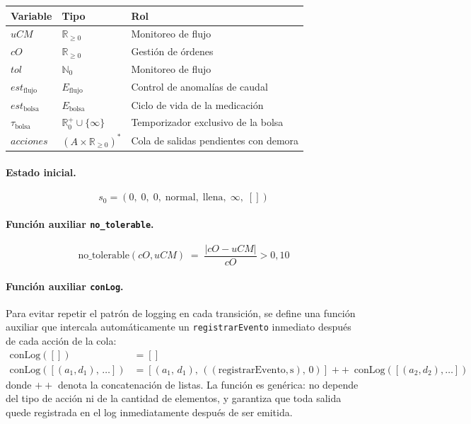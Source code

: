 \documentclass{article}
\begin{document}
\begin{center}
\begin{tabular}{lll}
\toprule
Variable & Tipo & Rol \\
\midrule
$uCM$                   & $\mathbb{R}_{\ge 0}$               & Monitoreo de flujo \\
$cO$                    & $\mathbb{R}_{\ge 0}$               & Gestión de órdenes \\
$tol$                   & $\mathbb{N}_0$                     & Monitoreo de flujo \\
$est_{\mathrm{flujo}}$  & $E_{\mathrm{flujo}}$               & Control de anomalías de caudal \\
$est_{\mathrm{bolsa}}$  & $E_{\mathrm{bolsa}}$               & Ciclo de vida de la medicación \\
$\tau_{\mathrm{bolsa}}$ & $\mathbb{R}_0^+\cup\{\infty\}$     & Temporizador exclusivo de la bolsa \\
$\mathit{acciones}$     & $(A \times \mathbb{R}_{\ge 0})^*$  & Cola de salidas pendientes con demora \\
\bottomrule
\end{tabular}
\end{center}

\paragraph{Estado inicial.}
\[
  s_0 = (0,\;0,\;0,\;\mathrm{normal},\;\mathrm{llena},\;\infty,\;[])
\]

\paragraph{Función auxiliar \texttt{no\_tolerable}.}
\[
  \mathrm{no\_tolerable}(cO,uCM)
  \;=\;
  \frac{|cO-uCM|}{cO} > 0{,}10
\]


\paragraph{Función auxiliar \texttt{conLog}.}
Para evitar repetir el patrón de logging en cada transición, se define una
función auxiliar que intercala automáticamente un \texttt{registrarEvento}
inmediato después de cada acción de la cola:
\begin{align*}
  \mathrm{conLog}([]) &= [] \\[4pt]
  \mathrm{conLog}([(a_1, d_1),\, \ldots]) &=
    [(a_1,\, d_1),\, (\mathrm{(registrarEvento,s)},\, 0)]
    \;\mathbin{+\!\!+}\;
    \mathrm{conLog}([(a_2, d_2), \ldots])
\end{align*}
donde $\mathbin{+\!\!+}$ denota la concatenación de listas. La función es
genérica: no depende del tipo de acción ni de la cantidad de elementos, y
garantiza que toda salida quede registrada en el log inmediatamente después
de ser emitida.
\end{document}

